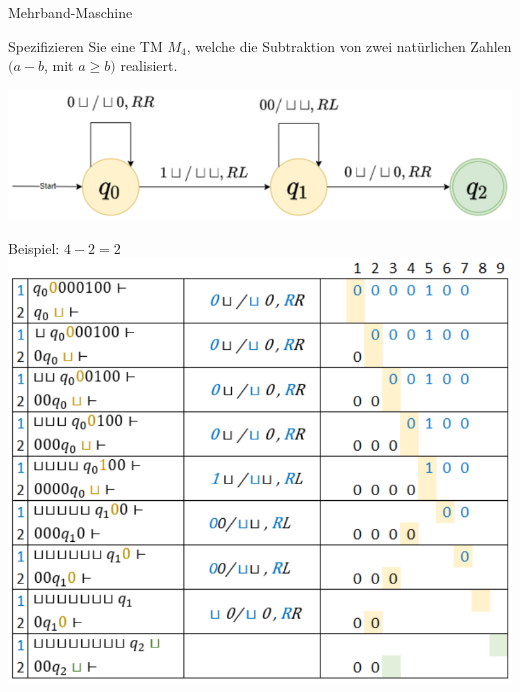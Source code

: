 \begin{example2}{Mehrband-Maschine}\\
    \begin{minipage}{0.4\linewidth}
    Spezifizieren Sie eine TM $M_{4}$, welche die Subtraktion von zwei natürlichen Zahlen $(a-b$, mit $a \geq b)$ realisiert.
    \end{minipage}
    \begin{minipage}{0.6\linewidth}
        \includegraphics[width=1\linewidth]{images/mehrband_maschine1.png}
    \end{minipage}
    
    Beispiel: $4-2=2$\\
    \includegraphics[width=0.7\linewidth]{images/mehrband_maschine2.png}
\end{example2}


